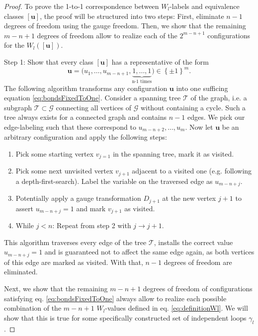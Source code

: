\documentclass[%
fontsize=12pt, %
twoside=off %
]{scrbook}
\begin{document}
\begin{proof}
To prove the 1-to-1 correspondence between $W_l$-labels and equivalence classes $[\bm u]$, the proof will be structured into two steps: First, eliminate ${n-1}$ degrees of freedom using the gauge freedom. Then, we show that the remaining $m-n+1$ degrees of freedom allow to realize each of the $2^{m-n+1}$ configurations for the $W_l([\bm u])$. 

Step 1: Show that every class $[\bm u]$ has a representative of the form
\begin{equation}
		\bm u = \big(u_1,\dots,u_{m-n+1},\underbrace{1,\dots,1}_\text{n-1 times}\big) \in \left\{\pm 1\right\}^m.
		\label{eq:bondsFixedToOne}
\end{equation}
The following algorithm transforms any configuration $\bm u$ into one sufficing equation \ref{eq:bondsFixedToOne}. Consider a spanning tree $\mathcal{T}$ of the graph, i.e. a subgraph $\mathcal{T}\subset \mathcal{G}$ connecting all vertices of $\mathcal{G}$ without containing a cycle. Such a tree always exists for a connected graph and contains $n-1$ edges. We pick our edge-labeling such that these correspond to $u_{m-n+2},\dots,u_{m}$. Now let $\bm u$ be an arbitrary configuration and apply the following steps:
\begin{enumerate}
	\item[1:] Pick some starting vertex $v_{j=1}$ in the spanning tree, mark it as visited.
	\item[2:] Pick some next unvisited vertex $v_{j+1}$ adjacent to a visited one (e.g. following a depth-first-search). Label the variable on the traversed edge as $u_{m-n+j}$.
	\item[3:] Potentially apply a gauge transformation $D_{j+1}$ at the new vertex $j+1$ to assert $u_{m-n+j}=1$ and mark $v_{j+1}$ as visited.
	\item[5:] While $j<n$: Repeat from step 2 with $j\to j+1$.
\end{enumerate}
This algorithm traverses every edge of the tree $\mathcal{T}$, installs the correct value $u_{m-n+j}=1$ and is guaranteed not to affect the same edge again, as both vertices of this edge are marked as visited. With that, $n-1$ degrees of freedom are eliminated.

Next, we show that the remaining $m-n+1$ degrees of freedom of configurations satisfying eq. \ref{eq:bondsFixedToOne} always allow to realize each possible combination of the $m-n+1$ $W_l$-values defined in eq. \ref{eq:definitionWl}. We will show that this is true for some specifically constructed set of independent loops $\gamma_l$.


\end{proof}
\end{document}
